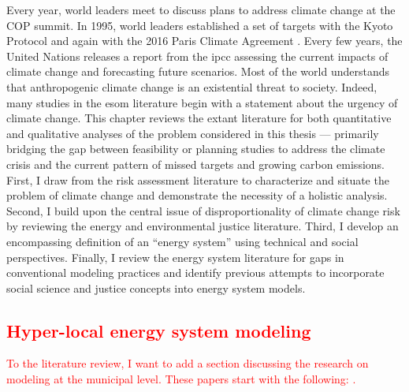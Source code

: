 Every year, world leaders meet to discuss plans to address climate change at the
COP summit. In 1995, world leaders established a set of targets with the Kyoto
Protocol \cite{united_nations_kyoto_1998} and again with the 2016 Paris Climate
Agreement \cite{united_nations_paris_2015}. Every few years, the United Nations
releases a report from the \ac{ipcc} assessing the current impacts of climate
change and forecasting future scenarios. Most of the world understands that
anthropogenic climate change is an existential threat to society. Indeed, many
studies in the \ac{esom} literature begin with a statement about the urgency of
climate change. This chapter reviews the extant literature for both quantitative
and qualitative analyses of the problem considered in this thesis --- primarily
bridging the gap between feasibility or planning studies to address the climate
crisis and the current pattern of missed targets and growing carbon emissions.
First, I draw from the risk assessment literature to characterize and situate
the problem of climate change and demonstrate the necessity of a holistic
analysis. Second, I build upon the central issue of disproportionality of
climate change risk by reviewing the energy and environmental justice
literature. Third, I develop an encompassing definition of an ``energy system''
using technical and social perspectives. Finally, I review the energy system
literature for gaps in conventional modeling practices and identify previous
attempts to incorporate social science and justice concepts into energy system
models.



%  
% 
% 



\textcolor{red}{\section{Hyper-local energy system modeling}}
\textcolor{red}{To the literature review, I want to add a section discussing 
the research on modeling at the municipal level. These papers start with the 
following: 
\cite{mckenna_combining_2018,johannsen_municipal_2023,ben_amer_too_2020}.}

